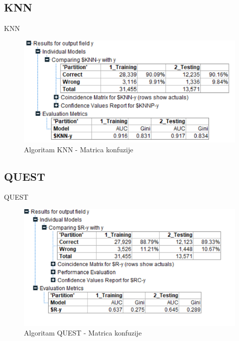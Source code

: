 \documentclass{beamer}
\begin{document}
\subsection{KNN}
\begin{frame}{KNN}
    \begin{figure}[h!]
                \begin{center}
                \includegraphics[scale=0.60]{knn_matrix.png}
                \end{center}
                \caption{Algoritam KNN - Matrica konfuzije}
             \end{figure}
\end{frame}

\subsection{QUEST}
\begin{frame}{QUEST}
    \begin{figure}[h!]
                \begin{center}
                \includegraphics[scale=0.60]{quest_matrix.png}
                \end{center}
                \caption{Algoritam QUEST - Matrica konfuzije}
             \end{figure}
\end{frame}
\end{document}
